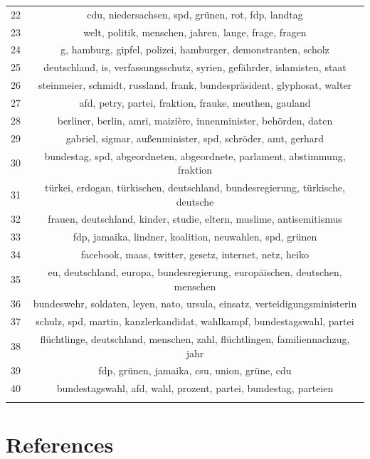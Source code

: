 \documentclass[
]{article}
\begin{document}
\begin{table}[!htbp]
\begin{tabular}{@{\extracolsep{5pt}} cc}
22 & cdu, niedersachsen, spd, grünen, rot, fdp, landtag \\ 
23 & welt, politik, menschen, jahren, lange, frage, fragen \\ 
24 & g, hamburg, gipfel, polizei, hamburger, demonstranten, scholz \\ 
25 & deutschland, is, verfassungsschutz, syrien, gefährder, islamisten, staat \\ 
26 & steinmeier, schmidt, russland, frank, bundespräsident, glyphosat, walter \\ 
27 & afd, petry, partei, fraktion, frauke, meuthen, gauland \\ 
28 & berliner, berlin, amri, maizière, innenminister, behörden, daten \\ 
29 & gabriel, sigmar, außenminister, spd, schröder, amt, gerhard \\ 
30 & bundestag, spd, abgeordneten, abgeordnete, parlament, abstimmung, fraktion \\ 
31 & türkei, erdogan, türkischen, deutschland, bundesregierung, türkische, deutsche \\ 
32 & frauen, deutschland, kinder, studie, eltern, muslime, antisemitismus \\ 
33 & fdp, jamaika, lindner, koalition, neuwahlen, spd, grünen \\ 
34 & facebook, maas, twitter, gesetz, internet, netz, heiko \\ 
35 & eu, deutschland, europa, bundesregierung, europäischen, deutschen, menschen \\ 
36 & bundeswehr, soldaten, leyen, nato, ursula, einsatz, verteidigungsministerin \\ 
37 & schulz, spd, martin, kanzlerkandidat, wahlkampf, bundestagswahl, partei \\ 
38 & flüchtlinge, deutschland, menschen, zahl, flüchtlingen, familiennachzug, jahr \\ 
39 & fdp, grünen, jamaika, csu, union, grüne, cdu \\ 
40 & bundestagswahl, afd, wahl, prozent, partei, bundestag, parteien \\ 
\hline \\[-1.8ex] 
\end{tabular} 
\end{table}

\hypertarget{references}{%
\section*{References}\label{references}}
\end{document}
